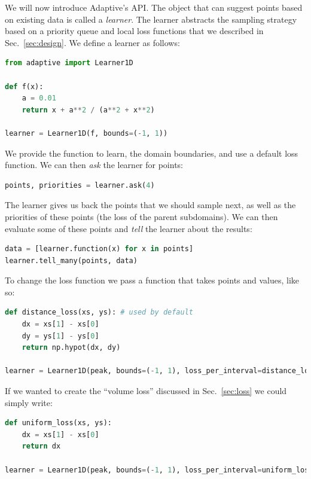 
We will now introduce Adaptive's API.
The object that can suggest points based on existing data is called a \emph{learner}.
The learner abstracts the sampling strategy based on a priority queue and local loss functions that we described in Sec.~\ref{sec:design}.
We define a learner as follows:

\begin{lstlisting}[language=Python]
from adaptive import Learner1D

def f(x):
    a = 0.01
    return x + a**2 / (a**2 + x**2)

learner = Learner1D(f, bounds=(-1, 1))
\end{lstlisting}

We provide the function to learn, the domain boundaries, and use a default loss function.
We can then \emph{ask} the learner for points:

\begin{lstlisting}[language=Python]
points, priorities = learner.ask(4)
\end{lstlisting}

The learner gives us back the points that we should sample next, as well as the priorities of these points (the loss of the parent subdomains).
We can then evaluate some of these points and \emph{tell} the learner about the results:

\begin{lstlisting}[language=Python]
data = [learner.function(x) for x in points]
learner.tell_many(points, data)
\end{lstlisting}

To change the loss function we pass a function that takes points and values, like so:

\begin{lstlisting}[language=Python]
def distance_loss(xs, ys): # used by default
    dx = xs[1] - xs[0]
    dy = ys[1] - ys[0]
    return np.hypot(dx, dy)

learner = Learner1D(peak, bounds=(-1, 1), loss_per_interval=distance_loss)
\end{lstlisting}

If we wanted to create the ``volume loss'' discussed in Sec.~\ref{sec:loss} we could simply write:

\begin{lstlisting}[language=Python]
def uniform_loss(xs, ys):
    dx = xs[1] - xs[0]
    return dx

learner = Learner1D(peak, bounds=(-1, 1), loss_per_interval=uniform_loss)
\end{lstlisting}

